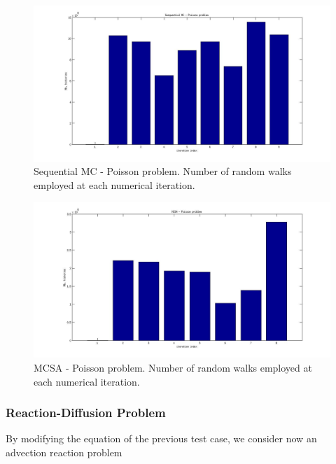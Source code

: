 \documentclass[a4paper,10pt]{article}
\begin{document}
\begin{figure}[h!]
  \centering
    \includegraphics[width=\textwidth]{SEQ_poisson.jpg}
    \caption{Sequential MC - Poisson problem. Number of random walks employed
at each numerical iteration.}
\label{SEQ_poisson}
\end{figure}


\begin{figure}[h!]
  \centering
    \includegraphics[width=\textwidth]{MCSA_poisson.jpg}
      \caption{MCSA - Poisson problem. Number of random walks employed at each
numerical iteration.}
\label{MCSA_poisson}
\end{figure}

\subsubsection{Reaction-Diffusion Problem}

By modifying the equation of the previous test case, we consider now
an advection reaction problem
\end{document}
